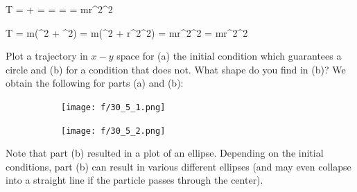 \be
T =  +  =  =  =  = mr^2\omega^2
\ee

\be
T = m\left(^2 + ^2\right) = m\left(^2 + r^2\dot{\theta}^2\right) = mr^2\dot{\theta}^2 = mr^2\omega^2
\ee
\item Plot a trajectory in $x-y$ space for (a) the initial condition which guarantees a circle and (b) for a condition that does not.  What shape do you find in (b)?
\newline We obtain the following for parts (a) and (b):
\begin{figure}[h!]
\begin{center}
\begin{subfigure}[h]{.45\textwidth}
    \begin{center}
    \texttt{[image: f/30\_5\_1.png]}
    \end{center}
\end{subfigure}
\begin{subfigure}[h]{.45\textwidth}
    \begin{center}
    \texttt{[image: f/30\_5\_2.png]}
    \end{center}
\end{subfigure}
\end{center}
\end{figure}
\newline Note that part (b) resulted in a plot of an ellipse. Depending on the initial conditions, part (b) can result in various different ellipses (and may even collapse into a straight line if the particle passes through the center).

\enu
\newpage
{}

